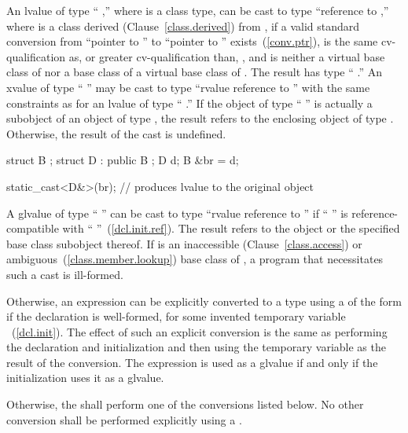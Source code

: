 \pnum
{}%
%
An lvalue of type `` ,'' where  is a class
type, can be cast to type ``reference to  ,'' where
 is a class derived (Clause~\ref{class.derived}) from
, if a valid standard conversion from ``pointer to ''
to ``pointer to '' exists~(\ref{conv.ptr}),  is the
same cv-qualification as, or greater cv-qualification than,
, and  is neither a virtual base class of 
nor a base class of a virtual base class of . The result has
type `` .'' An xvalue of type
`` '' may be cast to type ``rvalue reference to
 '' with the same constraints as for an lvalue of
type `` .'' If the object
of type `` '' is actually a subobject of an object
of type , the result refers to the enclosing object of type
. Otherwise, the result of the cast is undefined.
\enterexample 

\begin{codeblock}
struct B { };
struct D : public B { };
D d;
B &br = d;

static_cast<D&>(br);            // produces lvalue to the original  object
\end{codeblock}
\exitexample 

\pnum
A glvalue of type `` '' can be cast to type ``rvalue
reference to  '' if `` '' is
reference-compatible with `` ''~(\ref{dcl.init.ref}). The
result refers to the object or the specified base class subobject thereof. If
 is an inaccessible (Clause~\ref{class.access}) or
ambiguous~(\ref{class.member.lookup}) base class of ,
a program that necessitates such a cast is ill-formed.

\pnum
Otherwise, an expression  can be explicitly converted to a type
 using a  of the form
 if the declaration  is
well-formed, for some invented temporary variable
~(\ref{dcl.init}). The effect of such an explicit conversion is
the same as performing the declaration and initialization and then using
the temporary variable as the result of the conversion. The expression
 is used as a glvalue if and
only if the initialization uses it as a glvalue.

\pnum
Otherwise, the  shall perform one of the conversions
listed below. No other conversion shall be performed explicitly using a
.

